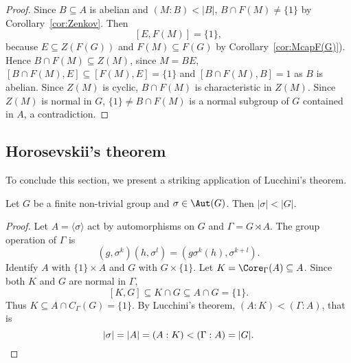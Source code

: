 \begin{proof}
	\medskip
	Since $B\subseteq A$ is abelian and $(M:B)<|B|$, $B\cap F(M)\ne\{1\}$ by Corollary~\ref{cor:Zenkov}. Then 
 \[
 [E,F(M)]=\{1\},
 \]
 because $E\subseteq
	Z(F(G))$ and $F(M)\subseteq F(G)$ by Corollary~\ref{cor:McapF(G)}).
	Hence $B\cap F(M)\subseteq Z(M)$, since $M=BE$, $[B\cap F(M),E]\subseteq
	[F(M),E]=\{1\}$ and $[B\cap F(M),B]=1$ as $B$ is abelian. Since 
	$Z(M)$ is cyclic, $B\cap F(M)$ is characteristic in $Z(M)$. Since 
	$Z(M)$ is normal in $G$, $\{1\}\ne B\cap F(M)$ is a normal subgroup of $G$
	contained in $A$, a contradiction. 
\end{proof}

\subsection{Horosevskii's theorem}

To conclude this section, we present a striking application of Lucchini's theorem.

\begin{corollary}[Horosevskii]
	Let $G$ be a finite non-trivial group and $\sigma\in\Aut(G)$. Then 
	$|\sigma|<|G|$.
\end{corollary}

\begin{proof}
	Let $A=\langle\sigma\rangle$ act by automorphisms on $G$ and 
	 $\Gamma=G\rtimes A$. The group operation of $\Gamma$ is 
	\[
	(g,\sigma^k)(h,\sigma^l)=(g\sigma^k(h),\sigma^{k+l}).
	\]
	Identify $A$ with $\{1\}\times A$ and $G$ with $G\times\{1\}$.
    Let $K=\Core_\Gamma(A)\subseteq A$. 
    Since both $K$ and $G$ are normal in $\Gamma$, 
    \[ 
    [K,G]\subseteq K\cap G\subseteq A\cap G=\{1\}.
    \]
    Thus  
    $K\subseteq A\cap C_\Gamma(G)=\{1\}$.
    By Lucchini's theorem, 
    $(A:K)<(\Gamma:A)$, that is
	\[
		|\sigma|=|A|=(A:K)<(\Gamma:A)=|G|.\qedhere
	\]
\end{proof}
